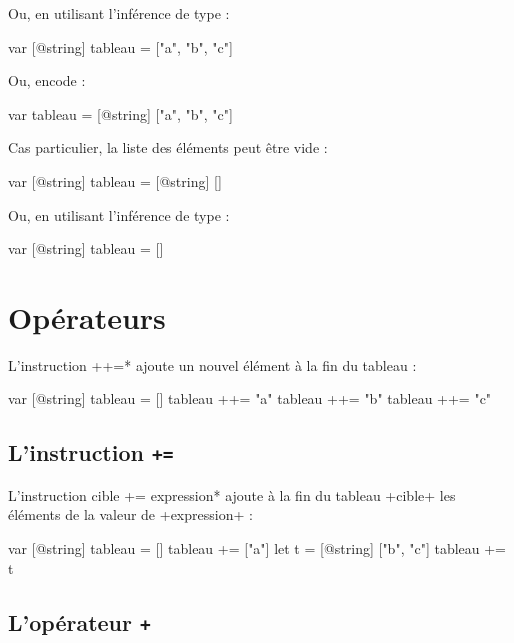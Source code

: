 Ou, en utilisant l'inférence de type :
\begin{galgas4}
var [@string] tableau = ["a", "b", "c"]
\end{galgas4}


Ou, encode :
\begin{galgas4}
var tableau = [@string] ["a", "b", "c"]
\end{galgas4}

Cas particulier, la liste des éléments peut être vide :
\begin{galgas4}
var [@string] tableau = [@string] []
\end{galgas4}


Ou, en utilisant l'inférence de type :
\begin{galgas4}
var [@string] tableau = []
\end{galgas4}




\section{Opérateurs}


L'instruction \ggsq*++=* ajoute un nouvel élément à la fin du tableau :\\

\begin{galgas4}
var [@string] tableau = []
tableau ++= "a"
tableau ++= "b"
tableau ++= "c"
\end{galgas4}



\subsection{L'instruction \texttt{+=}}

L'instruction \ggsq*cible += expression* ajoute à la fin du tableau \ggsq+cible+ les éléments de la valeur de \ggsq+expression+ :

\begin{galgas4}
var [@string] tableau = []
tableau += ["a"]
let t = [@string] ["b", "c"]
tableau += t
\end{galgas4}





\subsection{L'opérateur \texttt{+}}

